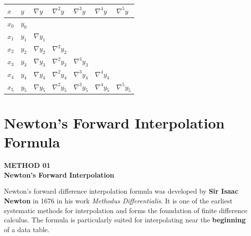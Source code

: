 \documentclass[12pt]{article}
\newcommand{\hcell}[1]{\textbf{\color{white}#1}}
\begin{document}
\begin{center}{\small
\begin{tabular}{C{1.5cm} C{1.5cm} C{2cm} C{2cm} C{2cm} C{2cm} C{2cm}}
\toprule
{}
\hcell{$x$} & \hcell{$y$} & \hcell{$\nabla y$} & \hcell{$\nabla^2 y$} & \hcell{$\nabla^3 y$} & \hcell{$\nabla^4 y$} & \hcell{$\nabla^5 y$} \\
\midrule
{}
$x_0$ & $y_0$ & & & & & \\
$x_1$ & $y_1$ & $\nabla y_1$ & & & & \\
$x_2$ & $y_2$ & $\nabla y_2$ & $\nabla^2 y_2$ & & & \\
$x_3$ & $y_3$ & $\nabla y_3$ & $\nabla^2 y_3$ & $\nabla^3 y_3$ & & \\
$x_4$ & $y_4$ & $\nabla y_4$ & $\nabla^2 y_4$ & $\nabla^3 y_4$ & $\nabla^4 y_4$ & \\
$x_5$ & $y_5$ & $\nabla y_5$ & $\nabla^2 y_5$ & $\nabla^3 y_5$ & $\nabla^4 y_5$ & $\nabla^5 y_5$ \\
\bottomrule
\end{tabular}
}\end{center}

\newpage

\section{Newton's Forward Interpolation Formula}

\begin{tcolorbox}[
  enhanced, arc=0pt, boxrule=0pt,
  colback=primary, colframe=primary,
  left=16pt, right=16pt, top=14pt, bottom=10pt,
  borderline south={4pt}{0pt}{accent},
]
  {\color{accent!70}\small\bfseries METHOD 01}\\[4pt]
  {\LARGE\bfseries\color{white} Newton's Forward Interpolation}
\end{tcolorbox}

\vspace{10pt}

\begin{histbox}
Newton's forward difference interpolation formula was developed by \textbf{Sir Isaac Newton} in 1676 in his work \textit{Methodus Differentialis}. It is one of the earliest systematic methods for interpolation and forms the foundation of finite difference calculus. The formula is particularly suited for interpolating near the \textbf{beginning} of a data table.
\end{histbox}
\end{document}
